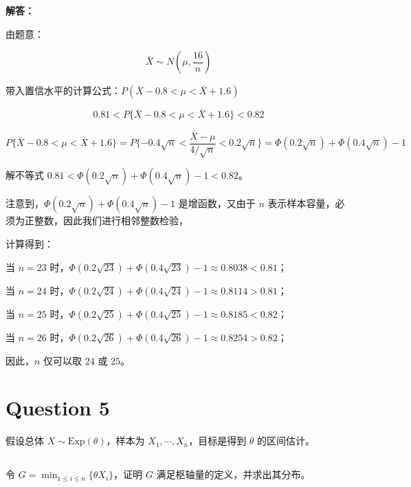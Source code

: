 \documentclass[12pt,a4paper]{article}
\begin{document}
\begin{answerbox}
\textbf{解答：}

由题意：

$$
\bar{X} \sim N(\mu, \frac{16}{n})
$$

带入置信水平的计算公式：$P\left(\bar{X}-0.8 < \mu < \bar{X}+1.6\right)$

$$
0.81 < P\{\bar{X}-0.8 < \mu < \bar{X}+1.6\} < 0.82
$$

$$
P\{\bar{X}-0.8 < \mu < \bar{X}+1.6\} = P\{-0.4\sqrt{n} < \frac{\bar{X}-\mu}{4/\sqrt{n}} < 0.2\sqrt{n}\} = \Phi(0.2\sqrt{n}) + \Phi(0.4\sqrt{n}) - 1
$$

解不等式 $0.81 < \Phi(0.2\sqrt{n}) + \Phi(0.4\sqrt{n}) - 1 < 0.82$。

注意到，$\Phi(0.2\sqrt{n}) + \Phi(0.4\sqrt{n}) - 1$ 是增函数，又由于 $n$ 表示样本容量，必须为正整数，因此我们进行相邻整数检验，

计算得到：

当 $n=23$ 时，$\Phi(0.2\sqrt{23}) + \Phi(0.4\sqrt{23}) - 1 \approx 0.8038 < 0.81$；

当 $n=24$ 时，$\Phi(0.2\sqrt{24}) + \Phi(0.4\sqrt{24}) - 1 \approx 0.8114 > 0.81$；

当 $n=25$ 时，$\Phi(0.2\sqrt{25}) + \Phi(0.4\sqrt{25}) - 1 \approx 0.8185 < 0.82$；

当 $n=26$ 时，$\Phi(0.2\sqrt{26}) + \Phi(0.4\sqrt{26}) - 1 \approx 0.8254 > 0.82$；

因此，$n$ 仅可以取 $24$ 或 $25$。

\end{answerbox}

\section{Question 5}

假设总体 $X \sim \text{Exp}(\theta)$，样本为 $X_1,\cdots,X_n$，目标是得到 $\theta$ 的区间估计。

\subsection{}

令 $G = \min_{1\leq i\leq n}\{\theta X_i\}$，证明 $G$ 满足枢轴量的定义，并求出其分布。
\end{document}
